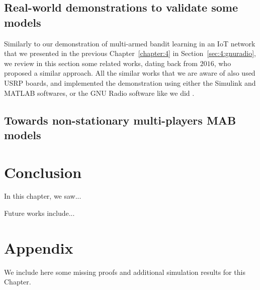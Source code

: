 \subsection{Real-world demonstrations to validate some models}
\label{sub:5:USRPdemos}

Similarly to our demonstration of multi-armed bandit learning in an IoT network that we presented in the previous Chapter~\ref{chapter:4} in Section~\ref{sec:4:gnuradio},
we review in this section some related works, dating back from $2016$, who proposed a similar approach.
All the similar works that we are aware of also used USRP boards, and implemented the demonstration using either the Simulink and MATLAB softwares, or the GNU Radio software like we did \cite{Besson2018ICT}.


\cite{Darak16}

\cite{modiDemo2016}

\cite{kumar2016two}

\cite{KumarYadav2018}

\cite{SawantKumar2018}

\cite{JoshiKumar2018}


\subsection{Towards non-stationary multi-players MAB models}
\label{sub:5:towardsNonStationaryModels}


\cite{WeiSrivastava18Distributed}

\cite{AlaturLevyKrause19}


\section{Conclusion}
\label{sec:5:conclusion}

In this chapter, we saw...

Future works include...



\section{Appendix}
\label{sec:5:appendix}

We include here some missing proofs and additional simulation results for this Chapter.



